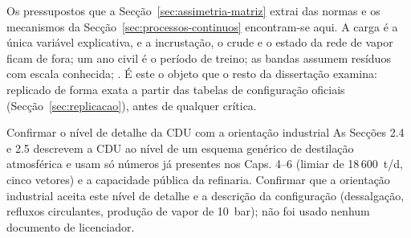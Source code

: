 Os pressupostos que a Secção~\ref{sec:assimetria-matriz} extrai das normas e
os mecanismos da Secção~\ref{sec:processos-continuos} encontram-se aqui. A
carga é a única variável explicativa, e a incrustação, o crude e o estado da
rede de vapor ficam de fora; um ano civil é o período de treino; as bandas
assumem resíduos com escala conhecida; . É este o objeto que o resto da dissertação examina: replicado de
forma exata a partir das tabelas de configuração oficiais
(Secção~\ref{sec:replicacao}), antes de qualquer crítica.

{Confirmar o nível de detalhe da CDU com a orientação industrial}
{As Secções 2.4 e 2.5 descrevem a CDU ao nível de um esquema genérico de
destilação atmosférica e usam só números já presentes nos Caps. 4--6
(limiar de 18\,600~t/d, cinco vetores) e a capacidade pública da refinaria.
Confirmar que a orientação industrial aceita este nível de detalhe e a
descrição da configuração (dessalgação, refluxos circulantes, produção de
vapor de 10~bar); não foi usado nenhum documento de licenciador.}%

